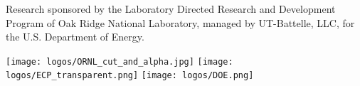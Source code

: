 \documentclass[final,hyperref={pdfpagelabels=false}]{beamer}
\begin{document}
\begin{frame}[t,fragile]
\begin{center}
Research sponsored by the Laboratory
Directed Research and Development Program of Oak Ridge National Laboratory,
managed by UT-Battelle, LLC, for the U.S. Department of Energy.
\end{center}


\begin{center}
  \texttt{[image: logos/ORNL\_cut\_and\_alpha.jpg]}\hspace{7ex}
  \texttt{[image: logos/ECP\_transparent.png]}\hspace{5ex}
  \texttt{[image: logos/DOE.png]}\hspace{7ex}
\end{center}

\end{frame}
\end{document}

